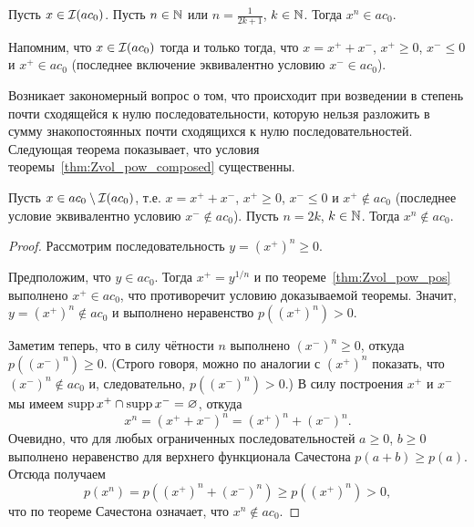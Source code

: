 \begin{theorem}
	\label{thm:Zvol_pow_composed}
	Пусть $x\in \mathcal{I}(ac_0)$.
	Пусть $n\in\mathbb{N}$ или $n = \frac1{2k+1}$, $k\in\mathbb{N}$.
	Тогда $x^n \in ac_0$.
\end{theorem}

Напомним, что $x\in \mathcal{I}(ac_0)$ тогда и только тогда, что $x = x^+ +x^-$, $x^+\geq 0$, $x^- \leq 0$ и $x^+ \in ac_0$
(последнее включение эквивалентно условию $x^- \in ac_0$).

Возникает закономерный вопрос о том, что происходит при возведении в степень почти сходящейся к нулю последовательности,
которую нельзя разложить в сумму знакопостоянных почти сходящихся к нулю последовательностей.
Следующая теорема показывает, что условия теоремы~\ref{thm:Zvol_pow_composed} существенны.

\begin{theorem}
	\label{thm:ac0_pow_even}
	Пусть $x\in ac_0 \setminus \mathcal{I}(ac_0)$, т.е. $x = x^+ +x^-$, $x^+\geq 0$, $x^- \leq 0$ и $x^+ \notin ac_0$
	(последнее условие эквивалентно условию $x^- \notin ac_0$).
	Пусть $n = 2k$, $k\in\mathbb{N}$.
	Тогда $x^n \notin ac_0$.
\end{theorem}

\begin{proof}
	Рассмотрим последовательность $y = (x^+)^n \geq 0$.

	Предположим, что $y \in ac_0$.
	Тогда $x^+ = y^{1/n}$ и по теореме~\ref{thm:Zvol_pow_pos} выполнено $x^+\in ac_0$,
	что противоречит условию доказываемой теоремы.
	Значит, $y = (x^+)^n \notin ac_0$ и выполнено неравенство $p\left((x^+)^n\right) > 0$.

	Заметим теперь, что  в силу чётности $n$ выполнено $(x^-)^n \geq 0$, откуда $p\left((x^-)^n\right) \geq 0$.
	(Строго говоря, можно по аналогии с $(x^+)^n$ показать, что $(x^-)^n\notin ac_0$ и, следовательно, $p\left((x^-)^n\right) > 0$.)
	В силу построения $x^+$ и $x^-$ мы имеем $\operatorname{supp} x^+ \cap \operatorname{supp} x^- = \varnothing$,
	откуда
	\begin{equation}
		x^n = (x^+ + x^-)^n = (x^+)^n + (x^-)^n
		.
	\end{equation}
	Очевидно, что для любых ограниченных последовательностей $a\geq0$, $b\geq 0$ выполнено неравенство для верхнего функционала Сачестона $p(a+b) \geq p(a)$.
	Отсюда получаем
	\begin{equation}
		p(x^n) = p\left((x^+)^n + (x^-)^n\right) \geq p\left((x^+)^n\right) > 0
		,
	\end{equation}
	что по теореме Сачестона означает, что $x^n \notin ac_0$.
\end{proof}


